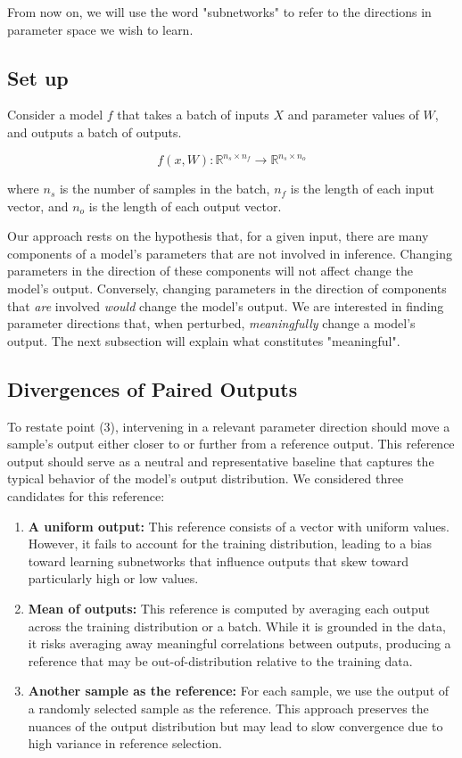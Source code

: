 \documentclass{article}
\theoremstyle{plain}
\theoremstyle{definition}
\theoremstyle{remark}
\begin{document}
From now on, we will use the word "subnetworks" to refer to the directions in parameter space we wish to learn. 

\subsection{Set up}\label{subsec:setup}


Consider a model $f$ that takes a batch of inputs $X$ and parameter values of $W$, and outputs a batch of outputs.

\begin{equation}
    f(x, W) : \mathbb{R}^{n_s \times n_f} \rightarrow \mathbb{R}^{n_s \times n_o}
\end{equation}

where $n_s$ is the number of samples in the batch, $n_f$ is the length of each input vector, and $n_o$ is the length of each output vector.

Our approach rests on the hypothesis that, for a given input, there are many components of a model's parameters that are not involved in inference. Changing parameters in the direction of these components will not affect change the model's output. Conversely, changing parameters in the direction of components that \textit{are} involved \textit{would} change the model's output. We are interested in finding parameter directions that, when perturbed, \textit{meaningfully} change a model's output.  The next subsection will explain what constitutes "meaningful".

\subsection{Divergences of Paired Outputs}\label{subsec:divergences}

To restate point (3), intervening in a relevant parameter direction should move a sample’s output either closer to or further from a reference output. This reference output should serve as a neutral and representative baseline that captures the typical behavior of the model’s output distribution. We considered three candidates for this reference:

\begin{enumerate}
    \item \textbf{A uniform output:} This reference consists of a vector with uniform values. However, it fails to account for the training distribution, leading to a bias toward learning subnetworks that influence outputs that skew toward particularly high or low values.
    \item \textbf{Mean of outputs:} This reference is computed by averaging each output across the training distribution or a batch. While it is grounded in the data, it risks averaging away meaningful correlations between outputs, producing a reference that may be out-of-distribution relative to the training data.
    \item \textbf{Another sample as the reference:} For each sample, we use the output of a randomly selected sample as the reference. This approach preserves the nuances of the output distribution but may lead to slow convergence due to high variance in reference selection.
\end{enumerate}
\end{document}
